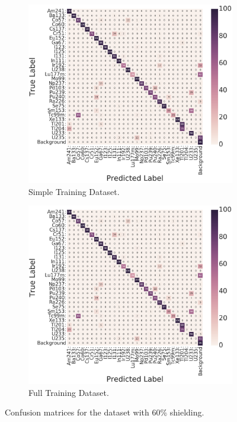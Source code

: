\begin{figure}[H]
     \begin{subfigure}[b]{0.49\textwidth}
         \centering
         \includegraphics[width=\textwidth]{model_choice_hyperparameter_search_images/conf_matrix_example.png}
         \caption{Simple Training Dataset.}
         \label{fig:results_easy_distance_comparison_simple}
     \end{subfigure}
     \hfill
     \begin{subfigure}[b]{0.49\textwidth}
         \centering
         \includegraphics[width=\textwidth]{model_choice_hyperparameter_search_images/conf_matrix_example.png}
         \caption{Full Training Dataset.}
         \label{fig:results_easy_distance_comparison_full}
     \end{subfigure}
     
        \caption{Confusion matrices for the dataset with 60\% shielding.}
        \label{fig:results_easy_distance_comparison}
\end{figure}



